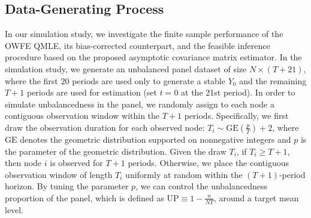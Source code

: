 \documentclass[11pt,a4paper]{article}
\begin{document}
\subsection{Data-Generating Process}
In our simulation study, we investigate the finite sample performance of the OWFE QMLE, its bias-corrected counterpart, and the feasible inference procedure based on the proposed asymptotic covariance matrix estimator.
In the simulation study, we generate an unbalanced panel dataset of size $N\times(T+21)$, where the first $20$ periods are used only to generate a stable $Y_0$ and the remaining $T+1$ periods are used for estimation (set $t=0$ at the 21st period).
In order to simulate unbalancedness in the panel, we randomly assign to each node a contiguous observation window within the $T+1$ periods. Specifically, we first draw the observation duration for each observed node: $T_i\sim \mathrm{GE}(\frac{p}{T})+2$, where $\mathrm{GE}$ denotes the geometric distribution supported on nonnegative integers and $p$ is the parameter of the geometric distribution. 
Given the draw \(T_i\), if $T_i\geq T+1$, then node $i$ is observed for $T+1$ periods.
Otherwise, we place the contiguous observation window of length $T_i$ uniformly at random within the $(T+1)$-period horizon. %
By tuning the parameter $p$, we can control the unbalancedness proportion of the panel, which is defined as $\mathrm{UP}\equiv1-\frac{n}{NT}$, around a target mean level.

\end{document}
